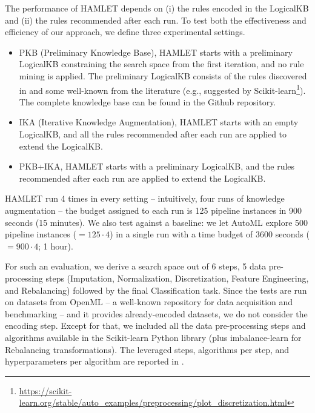 The performance of HAMLET depends on (i) the rules encoded in the LogicalKB and (ii) the rules recommended after each run.
To test both the effectiveness and efficiency of our approach, we define three experimental settings.
\begin{itemize}
    \item PKB (Preliminary Knowledge Base), HAMLET starts with a preliminary LogicalKB constraining the search space from the first iteration, and no rule mining is applied.
    The preliminary LogicalKB consists of the rules discovered in  and some well-known from the literature (e.g., suggested by Scikit-learn\footnote{\url{https://scikit-learn.org/stable/auto_examples/preprocessing/plot_discretization.html}}).
    The complete knowledge base can be found in the Github repository.
    \item IKA (Iterative Knowledge Augmentation), HAMLET starts with an empty LogicalKB, and all the rules recommended after each run are applied to extend the LogicalKB.
    \item PKB+IKA, HAMLET starts with a preliminary LogicalKB, and the rules recommended after each run are applied to extend the LogicalKB.
\end{itemize}
HAMLET run 4 times in every setting -- intuitively, four runs of knowledge augmentation -- the budget assigned to each run is 125 pipeline instances in 900 seconds (15 minutes).
We also test against a baseline: we let AutoML explore 500 pipeline instances ($= 125 \cdot 4$) in a single run with a time budget of 3600 seconds ($= 900 \cdot 4$; 1 hour).

For such an evaluation, we derive a search space out of 6 steps, 5 data pre-processing steps (Imputation, Normalization, Discretization, Feature Engineering, and Rebalancing) followed by the final Classification task.
Since the tests are run on datasets from OpenML \cite{OpenML2013} -- a well-known repository for data acquisition and benchmarking -- and it provides already-encoded datasets, we do not consider the encoding step. 
Except for that, we included all the data pre-processing steps and algorithms available in the Scikit-learn \cite{scikit-learn} Python library (plus imbalance-learn \cite{JMLR:v18:16-365} for Rebalancing transformations).
The leveraged steps, algorithms per step, and hyperparameters per algorithm are reported in .

